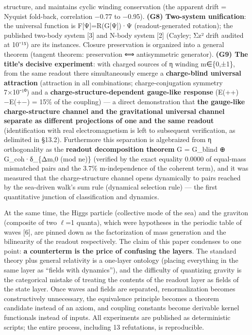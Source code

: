 \documentclass[
]{article}
\begin{document}
structure, and maintains cyclic winding conservation (the apparent drift
= Nyquist fold-back, correlation −0.77 to −0.95). \textbf{(G8)
Two-system unification}: the universal function is
F{[}Ψ{]}=R(G{[}Ψ{]})·Ψ (readout-generated rotation); the published
two-body system {[}3{]} and N-body system {[}2{]} (Cayley; Σz² drift
audited at 10⁻¹⁵) are its instances. Closure preservation is organized
into a general theorem (tangent theorem: preservation ⟺ antisymmetric
generator). \textbf{(G9) The title's decisive experiment}: with charged
sources of η winding m∈\{0,±1\}, from the same readout there
simultaneously emerge a \textbf{charge-blind universal attraction}
(attraction in all combinations; charge-conjugation symmetry 7×10⁻¹⁰)
and a \textbf{charge-structure-dependent gauge-like response}
(E(++)−E(+−) = 15\% of the coupling) --- a direct demonstration that
\textbf{the gauge-like charge-structure channel and the gravitational
universal channel separate as different projections of one and the same
readout} (identification with real electromagnetism is left to
subsequent verification, as delimited in §13.2). Furthermore this
separation is algebraized from η orthogonality as the \textbf{readout
decomposition theorem} G = G\_blind ⊕ G\_coh·δ\_\{Δm,0 (mod ne)\}
(verified by the exact equality 0.0000 of equal-mass mismatched pairs
and the 3.7\% \textbar m\textbar-independence of the coherent term), and
it was measured that the charge-structure channel opens dynamically to
pairs reached by the sea-driven walk's sum rule (dynamical selection
rule) --- the first quantitative junction of classification and
dynamics.

At the same time, the Higgs particle (collective mode of the sea) and
the graviton (composite of two \(\ell\)=1 quanta), which were hypotheses
in the periodic table of waves {[}6{]}, are pinned down as the
factorization of mass generation and the bilinearity of the readout
respectively. The claim of this paper condenses to one point: \textbf{a
counterterm is the price of confusing the layers}. The standard theory
plus general relativity is a one-layer ontology (placing everything in
the same layer as ``fields with dynamics''), and the difficulty of
quantizing gravity is the categorical mistake of treating the contents
of the readout layer as fields of the state layer. Once waves and fields
are separated, renormalization becomes constructively unnecessary, the
equivalence principle becomes a theorem candidate instead of an axiom,
and coupling constants become derivable kernel functionals instead of
inputs. All experiments are published as deterministic scripts; the
entire process, including 13 refutations, is reproducible.
\end{document}
